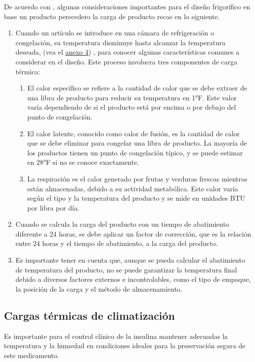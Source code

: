 De acuerdo con \citeauthor{bohn}, \citeyear{bohn} algunas consideraciones importantes para el diseño frigorífico en base un producto perecedero la carga de producto recae en lo siguiente. 
\begin{enumerate}
	\item Cuando un artículo se introduce en una cámara de refrigeración o congelación, su temperatura disminuye hasta alcanzar la temperatura deseada, (vea el \hyperref[anexo:bohn-perecederos]{anexo 4})  , para conocer algunas características comunes a considerar en el diseño. Este proceso involucra tres componentes de carga térmica:
	\begin{enumerate}
		\item El calor específico se refiere a la cantidad de calor que se debe extraer de una libra de producto para reducir su temperatura en 1°F. Este valor varía dependiendo de si el producto está por encima o por debajo del punto de congelación.
		\item El calor latente, conocido como calor de fusión, es la cantidad de calor que se debe eliminar para congelar una libra de producto. La mayoría de los productos tienen un punto de congelación típico, y se puede estimar en 28°F si no se conoce exactamente.
		\item La respiración es el calor generado por frutas y verduras frescas mientras están almacenadas, debido a su actividad metabólica. Este calor varía según el tipo y la temperatura del producto y se mide en unidades BTU por libra por día.
	\end{enumerate}
	\item Cuando se calcula la carga del producto con un tiempo de abatimiento diferente a 24 horas, se debe aplicar un factor de corrección, que es la relación entre 24 horas y el tiempo de abatimiento, a la carga del producto.
	\item Es importante tener en cuenta que, aunque se pueda calcular el abatimiento de temperatura del producto, no se puede garantizar la temperatura final debido a diversos factores externos e incontrolables, como el tipo de empaque, la posición de la carga y el método de almacenamiento.
\end{enumerate}
\subsection{Cargas térmicas de climatización}
Es importante para el control clínico de la insulina mantener adecuadas la temperatura y la humedad en condiciones ideales para la preservación segura de este medicamento.

